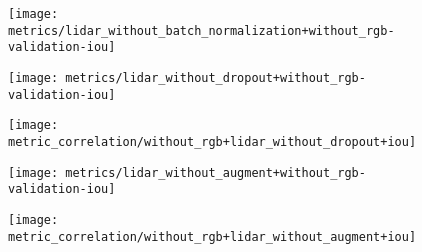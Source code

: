 
\begin{figure}[H]
  \centering
  \texttt{[image: metrics/lidar\_without\_batch\_normalization+without\_rgb-validation-iou]}
\end{figure}


\begin{figure}[H]
  \centering
  \texttt{[image: metrics/lidar\_without\_dropout+without\_rgb-validation-iou]}
\end{figure}

\begin{figure}[H]
  \centering
  \texttt{[image: metric\_correlation/without\_rgb+lidar\_without\_dropout+iou]}
\end{figure}


\begin{figure}[H]
  \centering
  \texttt{[image: metrics/lidar\_without\_augment+without\_rgb-validation-iou]}
\end{figure}

\begin{figure}[H]
  \centering
  \texttt{[image: metric\_correlation/without\_rgb+lidar\_without\_augment+iou]}
\end{figure}
